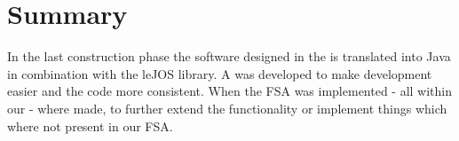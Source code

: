 \section{Summary}
In the last construction phase the software designed in the  is translated into Java in combination with the leJOS library. A  was developed to make development easier and the code more consistent. When the FSA was implemented  - all within our  - where made, to further extend the functionality or implement things which where not present in our FSA.